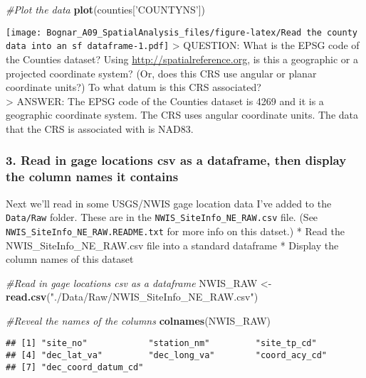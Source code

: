 \documentclass[]{article}
\newenvironment{Shaded}{\begin{snugshade}}{\end{snugshade}}
\newcommand{\KeywordTok}[1]{\textcolor[rgb]{0.13,0.29,0.53}{\textbf{#1}}}
\newcommand{\StringTok}[1]{\textcolor[rgb]{0.31,0.60,0.02}{#1}}
\newcommand{\CommentTok}[1]{\textcolor[rgb]{0.56,0.35,0.01}{\textit{#1}}}
\newcommand{\NormalTok}[1]{#1}
\begin{document}
\begin{Shaded}
\begin{Highlighting}[]
\CommentTok{#Plot the data}
\KeywordTok{plot}\NormalTok{(counties[}\StringTok{'COUNTYNS'}\NormalTok{])}
\end{Highlighting}
\end{Shaded}

\texttt{[image: Bognar\_A09\_SpatialAnalysis\_files/figure-latex/Read the county data into an sf dataframe-1.pdf]}
\textgreater{} QUESTION: What is the EPSG code of the Counties dataset?
Using \url{http://spatialreference.org}, is this a geographic or a
projected coordinate system? (Or, does this CRS use angular or planar
coordinate units?) To what datum is this CRS associated?\\
\textgreater{} ANSWER: The EPSG code of the Counties dataset is 4269 and
it is a geographic coordinate system. The CRS uses angular coordinate
units. The data that the CRS is associated with is NAD83.

\subsubsection{3. Read in gage locations csv as a dataframe, then
display the column names it
contains}\label{read-in-gage-locations-csv-as-a-dataframe-then-display-the-column-names-it-contains}

Next we'll read in some USGS/NWIS gage location data I've added to the
\texttt{Data/Raw} folder. These are in the
\texttt{NWIS\_SiteInfo\_NE\_RAW.csv} file. (See
\texttt{NWIS\_SiteInfo\_NE\_RAW.README.txt} for more info on this
datset.) * Read the NWIS\_SiteInfo\_NE\_RAW.csv file into a standard
dataframe * Display the column names of this dataset

\begin{Shaded}
\begin{Highlighting}[]
\CommentTok{#Read in gage locations csv as a dataframe}
\NormalTok{NWIS_RAW <-}\StringTok{ }\KeywordTok{read.csv}\NormalTok{(}\StringTok{"./Data/Raw/NWIS_SiteInfo_NE_RAW.csv"}\NormalTok{)}

\CommentTok{#Reveal the names of the columns}
\KeywordTok{colnames}\NormalTok{(NWIS_RAW)}
\end{Highlighting}
\end{Shaded}

\begin{verbatim}
## [1] "site_no"            "station_nm"         "site_tp_cd"        
## [4] "dec_lat_va"         "dec_long_va"        "coord_acy_cd"      
## [7] "dec_coord_datum_cd"
\end{verbatim}
\end{document}
